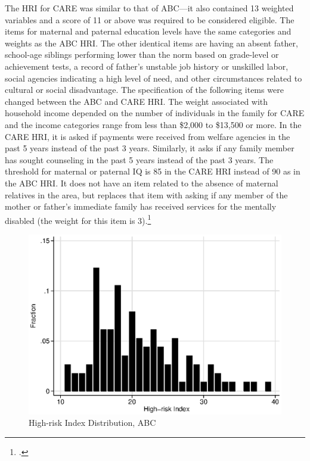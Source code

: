 \begin{appendices}
\noindent The HRI for CARE was similar to that of ABC---it also contained 13 weighted variables and a score of 11 or above was required to be considered eligible. The items for maternal and paternal education levels have the same categories and weights as the ABC HRI. The other identical items are having an absent father,  school-age siblings performing lower than the norm based on grade-level or achievement tests, a record of father's unstable job history or unskilled labor, social agencies indicating a high level of need, and other circumstances related to cultural or social disadvantage. The specification of the following items were changed between the ABC and CARE HRI. The weight associated with household income depended on the number of individuals in the family for CARE and the income categories range from less than \$2,000 to \$13,500 or more. In the CARE HRI, it is asked if payments were received from welfare agencies in the past 5 years instead of the past 3 years. Similarly, it asks if any family member has sought counseling in the past 5 years instead of the past 3 years. The threshold for maternal or paternal IQ is 85 in the CARE HRI instead of 90 as in the ABC HRI.  It does not have an item related to the absence of maternal relatives in the area, but replaces that item with asking if any member of the mother or father's immediate family has received services for the mentally disabled (the weight for this item is 3).\footnote{\citet{Ramey_etal_1985_Project-CARE_TiECSE}.}
\begin{center}
	\begin{figure}[H]
		\caption{High-risk Index Distribution, ABC} \label{figure:hridistabc}
		\centering
		\includegraphics[width=.9\columnwidth]{output/abc_hri.eps}
	\end{figure}
\end{center}


\end{appendices}

